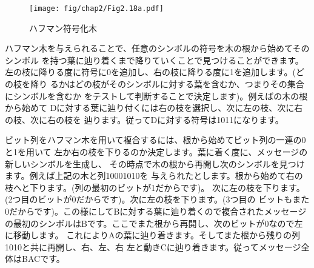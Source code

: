 \begin{figure}[tb]
\label{Figure 2.18}
\centering
\begin{comment}
\heading{Figure 2.18:} A Huffman encoding tree.

\begin{example}
           {A B C D E F G H} 17
                    *
                   / \
                  /   \
                A 8    * {B C D E F G H} 9
            __________/ \_____________
           /                          \
{B C D} 5 *                            * {E F G H} 4
         / \                       ___/ \___
        /   \                     /         \
      B 3    * {C D} 2   {E F} 2 *           * {G H} 2
            / \                 / \         / \
           /   \               /   \       /   \
         C 1   D 1           E 1   F 1   G 1   H 1
\end{example}
\end{comment}
\texttt{[image: fig/chap2/Fig2.18a.pdf]}
\par\bigskip
\noindent
\heading{Figure 2.18:} ハフマン符号化木
\end{figure}

\noindent
ハフマン木を与えられることで、任意のシンボルの符号を木の根から始めてそのシンボル
を持つ葉に辿り着くまで降りていくことで見つけることができます。
左の枝に降りる度に符号に0を追加し、右の枝に降りる度に1を追加します。(どの枝を降り
るかはどの枝がそのシンボルに対する葉を含むか、つまりその集合にシンボルを含むか
をテストして判断することで決定します)。例えばの木の根から始めて
Dに対する葉に辿り付くには右の枝を選択し、次に左の枝、次に右の枝、次に右の枝を
辿ります。従ってDに対する符号は1011になります。



ビット列をハフマン木を用いて複合するには、根から始めてビット列の一連の0と1を用いて
左か右の枝を下りるのか決定します。葉に着く度に、メッセージの新しいシンボルを生成し、
その時点で木の根から再開し次のシンボルを見つけます。例えば上記の木と列10001010を
与えられたとします。根から始めて右の枝へと下ります。(列の最初のビットが1だからです)。
次に左の枝を下ります。(2つ目のビットが0だからです)。次に左の枝を下ります。(3つ目の
ビットもまた0だからです)。この様にしてBに対する葉に辿り着くので複合されたメッセージ
の最初のシンボルはBです。ここでまた根から再開し、次のビットが0なので左に移動します。
これによりAの葉に辿り着きます。そしてまた根から残りの列1010と共に再開し、右、左、右
左と動きCに辿り着きます。従ってメッセージ全体はBACです。

